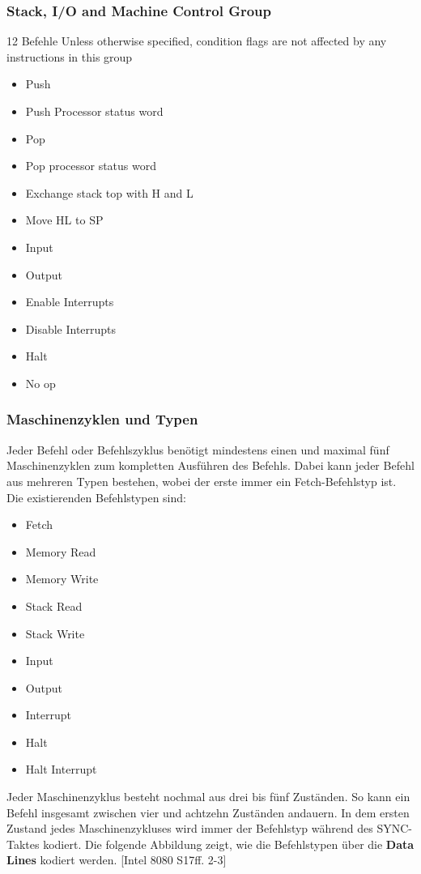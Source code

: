 \documentclass[12pt]{article}
\newcommand{\imgSpaceBefore}{\\[0.2cm]}
\begin{document}
\subsubsection{Stack, I/O and Machine Control Group}
12  Befehle
Unless otherwise specified, condition flags are not
affected by any instructions in this group

\begin{multicols}{2}
\begin{itemize}
\item Push
\item Push Processor status word
\item Pop
\item Pop processor status word
\item Exchange stack top with H and L
\item Move HL to SP
\item Input
\item Output
\item Enable Interrupts
\item Disable Interrupts
\item Halt
\item No op
\end{itemize}
\end{multicols}


\subsubsection{Maschinenzyklen und Typen}
Jeder Befehl oder Befehlszyklus benötigt mindestens einen und maximal fünf Maschinenzyklen zum kompletten Ausführen des Befehls. Dabei kann jeder Befehl aus mehreren Typen bestehen, wobei der erste immer ein Fetch-Befehlstyp ist. Die existierenden Befehlstypen sind:

\begin{itemize}
\item Fetch
\item Memory Read
\item Memory Write
\item Stack Read
\item Stack Write
\item Input
\item Output
\item Interrupt
\item Halt
\item Halt Interrupt
\end{itemize}\noindent
Jeder Maschinenzyklus besteht nochmal aus drei bis fünf Zuständen. So kann ein Befehl insgesamt zwischen vier und achtzehn Zuständen andauern.
In dem ersten Zustand jedes Maschinenzykluses wird immer der Befehlstyp während des SYNC-Taktes kodiert. Die folgende Abbildung zeigt, wie die Befehlstypen über die \textbf{Data Lines} kodiert werden. [Intel 8080 S17ff. 2-3]
\imgSpaceBefore
\end{document}
